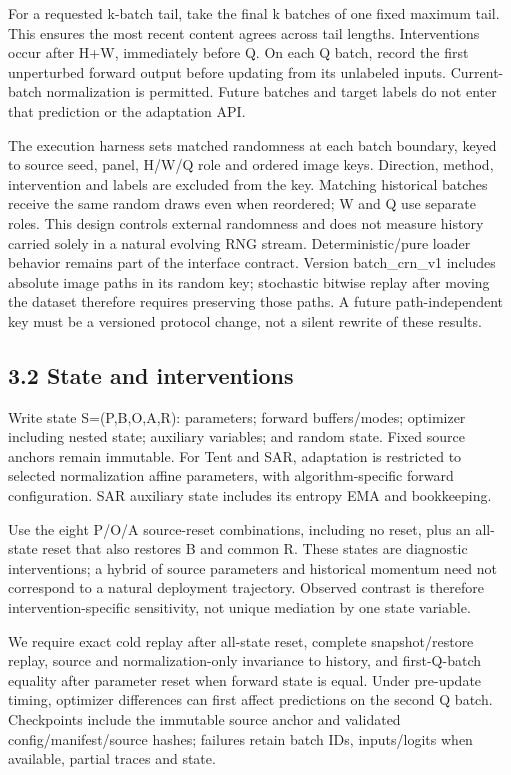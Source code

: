 \documentclass[11pt]{article}
\begin{document}
For a requested k-batch tail, take the final k batches of one fixed maximum tail. This ensures the most recent content agrees across tail lengths. Interventions occur after H+W, immediately before Q. On each Q batch, record the first unperturbed forward output before updating from its unlabeled inputs. Current-batch normalization is permitted. Future batches and target labels do not enter that prediction or the adaptation API.

The execution harness sets matched randomness at each batch boundary, keyed to source seed, panel, H/W/Q role and ordered image keys. Direction, method, intervention and labels are excluded from the key. Matching historical batches receive the same random draws even when reordered; W and Q use separate roles. This design controls external randomness and does not measure history carried solely in a natural evolving RNG stream. Deterministic/pure loader behavior remains part of the interface contract. Version batch\_crn\_v1 includes absolute image paths in its random key; stochastic bitwise replay after moving the dataset therefore requires preserving those paths. A future path-independent key must be a versioned protocol change, not a silent rewrite of these results.

\subsection*{3.2 State and interventions}

Write state S=(P,B,O,A,R): parameters; forward buffers/modes; optimizer including nested state; auxiliary variables; and random state. Fixed source anchors remain immutable. For Tent and SAR, adaptation is restricted to selected normalization affine parameters, with algorithm-specific forward configuration. SAR auxiliary state includes its entropy EMA and bookkeeping.

Use the eight P/O/A source-reset combinations, including no reset, plus an all-state reset that also restores B and common R. These states are diagnostic interventions; a hybrid of source parameters and historical momentum need not correspond to a natural deployment trajectory. Observed contrast is therefore intervention-specific sensitivity, not unique mediation by one state variable.

We require exact cold replay after all-state reset, complete snapshot/restore replay, source and normalization-only invariance to history, and first-Q-batch equality after parameter reset when forward state is equal. Under pre-update timing, optimizer differences can first affect predictions on the second Q batch. Checkpoints include the immutable source anchor and validated config/manifest/source hashes; failures retain batch IDs, inputs/logits when available, partial traces and state.
\end{document}
